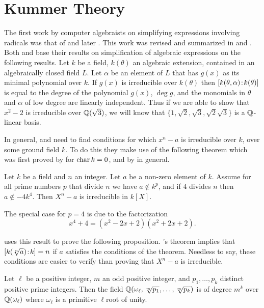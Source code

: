\section{Kummer Theory}
\label{Kummer:Sec}

The first work by computer algebraists on simplifying expressions
involving radicals was that of {\Caviness}
\cite{Caviness1970-qs} and later {\Fateman}
\cite{Fateman1971-pt}.  This work was revised and summarized in
{\Caviness} and {\Fateman} \cite{Caviness1976-uc}.  Both {\Caviness}
and {\Fateman} base their results on simplification of algebraic
expressions on the following results.  Let $k$ be a field, $k(\theta)$
an algebraic extension, contained in an algebraically closed field
$L$.  Let $\alpha$ be an element of $L$ that has $g(x)$ as its minimal
polynomial over $k$.  If $g(x)$ is irreducible over $k(\theta)$ then
$[k(\theta,\alpha)\!:\!k(\theta)]$ is equal to the degree of
the polynomial $g(x)$, $\deg g$, and the monomials in $\theta$ and
$\alpha$ of low degree are linearly independent.  Thus if we are able
to show that $x^2 - 2$ is irreducible over $\mathbb{Q}(\sqrt{3})$, we will
know that $\{1, \sqrt{2}, \sqrt{3}, \sqrt{2} \sqrt{3}\}$ is a
$\mathbb{Q}$-linear basis.

In general, {\Caviness} and {\Fateman} need to find conditions for
which $x^n - a$ is irreducible over $k$, over some ground field $k$.
To do this they make use of the following theorem which was first
proved by {\Capelli} \cite{Capelli1897-vf} for $\mathop{\rm char}\nolimits k = 0$, and by {\Redei}
\cite{Redei1959-kr} in general.

\begin{proposition}[{\Capelli}] \label{Capelli:Prop}
Let $k$ be a field and $n$ an integer.  Let $a$ be a non-zero element
of $k$.  Assume for all prime numbers $p$ that divide $n$ we have $a
\notin k^p$, and if $4$ divides $n$ then $a \notin -4k^4$.  Then $X^n
- a$ is irreducible in $k[X]$.
\end{proposition}

\noindent
The special case for $p=4$ is due to the factorization 
\[
x^4+4 = (x^2-2x+2)(x^2+2x+2).
\]

{\Caviness} uses this result to prove the following proposition.
{\Capelli}'s theorem implies that $\fieldDegree{k(\root n\of{a})}{k} =
n$ if $a$ satisfies the conditions of the theorem.  Needless to say,
these conditions are easier to verify than proving that $X^n -a$ is
irreducible.

\begin{proposition}
Let $\ell$ be a positive integer, $m$ an odd positive integer, and
$p_1, \ldots, p_k$ distinct positive prime integers.  Then the field
$\Q(\omega_{\ell}, \root m \of {p_1}, \ldots, \root m \of {p_k})$ is
of degree $m^k$ over $\mathbb{Q}(\omega_{\ell})$ where $\omega_{\ell}$ is a
primitive $\ell$\th root of unity.
\end{proposition}

